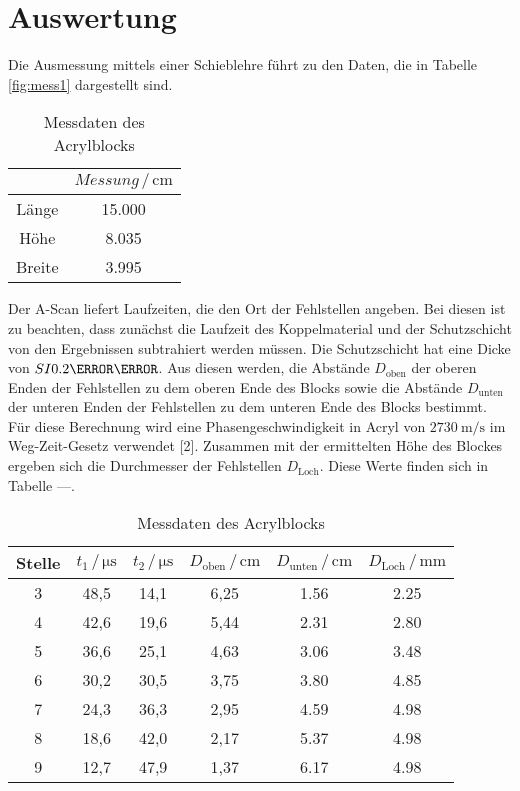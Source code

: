 \section{Auswertung}
\label{sec:Auswertung}


Die Ausmessung mittels einer Schieblehre führt zu den Daten, die in Tabelle \ref{fig:mess1} 
dargestellt sind. 

\begin{table}
  \centering
  \caption{Messdaten des Acrylblocks}
  \label{tab:mess1}
  \begin{tabular}{c c}
  \toprule
  &$Messung \,/\, \si{\centi\meter}$\\
  \midrule 
  Länge  & 15.000\\
  Höhe   &  8.035\\
  Breite &  3.995
  \bottomrule
  \end{tabular}
  \end{table}

Der A-Scan liefert Laufzeiten, die den Ort der Fehlstellen angeben. Bei diesen ist zu beachten, 
dass zunächst die Laufzeit des Koppelmaterial und der Schutzschicht von den Ergebnissen 
subtrahiert werden müssen. Die Schutzschicht hat eine Dicke von $SI{0.2}{\centi\meter}$. 
Aus diesen werden, die Abstände $D_\text{oben}$ der oberen Enden der Fehlstellen zu dem oberen Ende des 
Blocks sowie die Abstände $D_\text{unten}$ der unteren Enden der Fehlstellen zu dem unteren Ende des Blocks 
bestimmt. Für diese Berechnung wird eine Phasengeschwindigkeit in Acryl von $\SI{2730}{\meter\per\second}$ im 
Weg-Zeit-Gesetz verwendet [2]. Zusammen mit der ermittelten Höhe des Blockes ergeben sich die Durchmesser 
der Fehlstellen $D_\text{Loch}$. Diese Werte finden sich in Tabelle ---.

\begin{table}
\centering
\caption{Messdaten des Acrylblocks}
\label{tab:mess1}
\begin{tabular}{c c c c c c}
\toprule
Stelle & $t_1 \,/\, \si{\micro\second}$ & $t_2 \,/\, \si{\micro\second}$ &$D_\text{oben} \,/\, \si{\centi\meter}$&$D_\text{unten} \,/\, \si{\centi\meter}$ & $D_\text{Loch} \,/\, \si{\milli\meter}$\\
\midrule 
3 & 48,5 & 14,1 & 6,25 & 1.56 & 2.25 \\
4 & 42,6 & 19,6 & 5,44 & 2.31 & 2.80\\
5 & 36,6 & 25,1 & 4,63 & 3.06 & 3.48\\
6 & 30,2 & 30,5 & 3,75 & 3.80 & 4.85\\
7 & 24,3 & 36,3 & 2,95 & 4.59 & 4.98\\
8 & 18,6 & 42,0 & 2,17 & 5.37 & 4.98\\
9 & 12,7 & 47,9 & 1,37 & 6.17 & 4.98\\
\bottomrule
\end{tabular}
\end{table}

